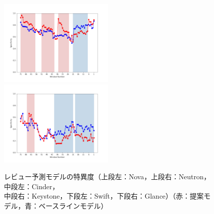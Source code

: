 \documentclass[11pt]{jreport}
\begin{document}
\begin{figure}[H]
\begin{minipage}{\textwidth}
\begin{center}
    \includegraphics[width=0.495\textwidth]{Uenaka_fig/RQ2_result/Swift_review_Specificity.pdf}
    \includegraphics[width=0.495\textwidth]{Uenaka_fig/RQ2_result/Glance_review_Specificity.pdf}
    \caption{レビュー予測モデルの特異度（上段左：Nova，上段右：Neutron，中段左：Cinder，\\ 中段右：Keystone，下段左：Swift，下段右：Glance）（赤：提案モデル，青：ベースラインモデル）}
    \label{fig:review_spec}
\end{center}
\vspace{0.08\textheight}
\end{minipage}
\end{figure}
\end{document}
